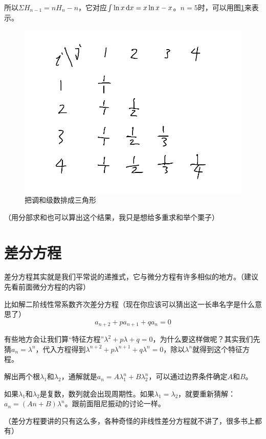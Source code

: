 所以$\Sigma H_{n-1}=n H_n-n$，它对应$\int \ln x \mathop{}\!\mathrm{d} x=x \ln x-x$。$n=5$时，可以用图\ref{fig-triangle-harmonic}来表示。
\begin{figure}[htb]
\centering
\includegraphics[scale=0.5]{fig/triangle-harmonic.png}
\caption{把调和级数排成三角形}
\label{fig-triangle-harmonic}
\end{figure}

（用分部求和也可以算出这个结果，我只是想给多重求和举个栗子）
\section{差分方程}
差分方程其实就是我们平常说的递推式，它与微分方程有许多相似的地方。（建议先看前面微分方程的内容）

比如解二阶线性常系数齐次差分方程（现在你应该可以猜出这一长串名字是什么意思了）
\begin{equation*}
a_{n+2}+p a_{n+1}+q a_n=0
\end{equation*}

有些地方会让我们算“特征方程”$\lambda^2+p \lambda+q=0$，为什么要这样做呢？其实我们先猜$a_n=\lambda^n$，代入方程得到$\lambda^{n+2}+p \lambda^{n+1}+q \lambda^n=0$，除以$\lambda^n$就得到这个特征方程。

解出两个根$\lambda_1$和$\lambda_2$，通解就是$a_n=A \lambda_1^n+B \lambda_2^n$，可以通过边界条件确定$A$和$B$。

如果$\lambda_1$和$\lambda_2$是复数，数列就会出现周期性。如果$\lambda_1=\lambda_2$，就要重新猜解：$a_n=(A n+B)\lambda^n$。跟前面阻尼振动的讨论一样。

（差分方程要讲的只有这么多，各种奇怪的非线性差分方程就不讲了，很多书上都有）
